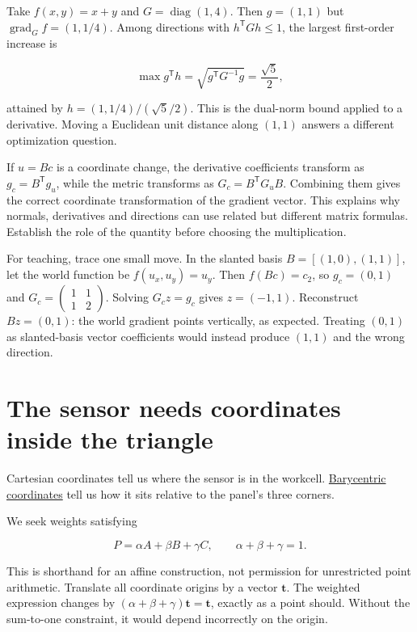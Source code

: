 Take \(f(x,y)=x+y\) and \(G=\operatorname{diag}(1,4)\). Then \(g=(1,1)\) but \(\operatorname{grad}_Gf=(1,1/4)\). Among directions with \(h^{\mathsf T}Gh\le1\), the largest first-order increase is

\[
\max g^{\mathsf T}h=\sqrt{g^{\mathsf T}G^{-1}g}=\frac{\sqrt5}{2},
\]

attained by \(h=(1,1/4)/(\sqrt5/2)\). This is the dual-norm bound applied to a derivative. Moving a Euclidean unit distance along \((1,1)\) answers a different optimization question.

If \(u=Bc\) is a coordinate change, the derivative coefficients transform as \(g_c=B^{\mathsf T}g_u\), while the metric transforms as \(G_c=B^{\mathsf T}G_uB\). Combining them gives the correct coordinate transformation of the gradient vector. This explains why normals, derivatives and directions can use related but different matrix formulas. Establish the role of the quantity before choosing the multiplication.

For teaching, trace one small move. In the slanted basis \(B=[(1,0),(1,1)]\), let the world function be \(f(u_x,u_y)=u_y\). Then \(f(Bc)=c_2\), so \(g_c=(0,1)\) and \(G_c=\begin{pmatrix}1&1\\1&2\end{pmatrix}\). Solving \(G_cz=g_c\) gives \(z=(-1,1)\). Reconstruct \(Bz=(0,1)\): the world gradient points vertically, as expected. Treating \((0,1)\) as slanted-basis vector coefficients would instead produce \((1,1)\) and the wrong direction.

\section{The sensor needs coordinates inside the triangle}\label{01-foundations-i-ch018-the-sensor-needs-coordinates-inside-the-triangle}

\hypertarget{01-foundations-i-ch018-the-sensor-needs-coordinates-inside-the-triangle}{}

Cartesian coordinates tell us where the sensor is in the workcell. \hyperref[01-foundations-i-ch018-the-sensor-needs-coordinates-inside-the-triangle]{Barycentric coordinates} tell us how it sits relative to the panel's three corners.

We seek weights satisfying

\[
P=\alpha A+\beta B+\gamma C,
\qquad \alpha+\beta+\gamma=1.
\]

This is shorthand for an affine construction, not permission for unrestricted point arithmetic. Translate all coordinate origins by a vector \(\mathbf t\). The weighted expression changes by \((\alpha+\beta+\gamma)\mathbf t=\mathbf t\), exactly as a point should. Without the sum-to-one constraint, it would depend incorrectly on the origin.

